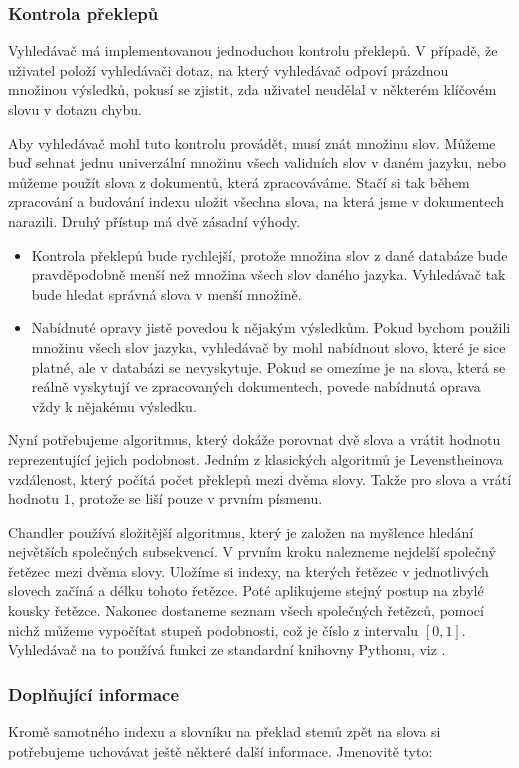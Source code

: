 \documentclass[12pt]{article}
\newcommand{\name}{Chandler}
\newcommand{\sssection}[1]{\subsubsection{#1}}
\begin{document}
\sssection{Kontrola překlepů}
Vyhledávač má implementovanou jednoduchou kontrolu překlepů. V případě, že uživatel položí vyhledávači dotaz, na který vyhledávač odpoví prázdnou množinou výsledků, pokusí se zjistit, zda uživatel neudělal v některém klíčovém slovu v dotazu chybu. 

Aby vyhledávač mohl tuto kontrolu provádět, musí znát množinu  slov. Můžeme buď sehnat jednu univerzální množinu všech validních slov v daném jazyku, nebo můžeme použít slova z dokumentů, která zpracováváme. Stačí si tak během zpracování a budování indexu uložit všechna slova, na která jsme v dokumentech narazili. Druhý přístup má dvě zásadní výhody.

\begin{itemize}
	\item Kontrola překlepů bude rychlejší, protože množina slov z dané databáze bude pravděpodobně menší než množina všech slov daného jazyka. Vyhledávač tak bude hledat správná slova v menší množině. 
	\item Nabídnuté opravy jistě povedou k nějakým výsledkům. Pokud bychom použili množinu všech slov jazyka, vyhledávač by mohl nabídnout slovo, které je sice platné, ale v databázi se nevyskytuje. Pokud se omezíme je na slova, která se reálně vyskytují ve zpracovaných dokumentech, povede nabídnutá oprava vždy k nějakému výsledku.
\end{itemize}

Nyní potřebujeme algoritmus, který dokáže porovnat dvě slova a vrátit hodnotu reprezentující jejich podobnost. Jedním z klasických algoritmů je Levenstheinova vzdálenost, který počítá počet překlepů mezi dvěma slovy. Takže pro slova  a  vrátí hodnotu $1$, protože se liší pouze v prvním písmenu. 

\name{} používá složitější algoritmus, který je založen na myšlence hledání největších společných subsekvencí. V prvním kroku nalezneme nejdelší společný řetězec mezi dvěma slovy. Uložíme si indexy, na kterých řetězec v jednotlivých slovech začíná a délku tohoto řetězce. Poté aplikujeme stejný postup na zbylé kousky řetězce. Nakonec dostaneme seznam všech společných řetězců, pomocí nichž můžeme vypočítat stupeň podobnosti, což je číslo z intervalu $[0, 1]$. Vyhledávač na to používá funkci ze standardní knihovny Pythonu, viz \cite{pydiff}.



\sssection{Doplňující informace}
Kromě samotného indexu a slovníku na překlad stemů zpět na slova si potřebujeme uchovávat ještě některé další informace. Jmenovitě tyto: 
\end{document}

